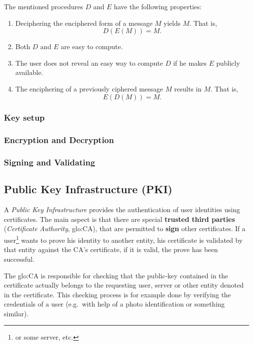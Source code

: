 The mentioned procedures $D$ and $E$ have the following properties:
\begin{enumerate}
\item Deciphering  the enciphered form of  a message $M$  yields $M$. That
  is,
  \begin{equation}
    \label{eq:1}
    D(E(M)) = M.
  \end{equation}
\item Both $D$ and $E$ are easy to compute.
\item The user does not reveal an  easy way to compute $D$ if he makes $E$
  publicly available.
\item The enciphering of a previously ciphered message $M$ results in
  $M$. That is,
  \begin{equation}
    \label{eq:1}
    E(D(M)) = M.
  \end{equation}
\end{enumerate}

\subsubsection{Key setup}

\subsubsection{Encryption and Decryption}

\subsubsection{Signing and Validating}


\subsection[Public Key Infrastructure]{Public Key Infrastructure (PKI)}

A  \emph{Public Key  Infrastructure} provides  the authentication  of user
identities using certificates.  The main  aspect is that there are special
\textbf{trusted    third     parties}    (\emph{Certificate    Authority},
\gls{glo:CA}), that are permitted  to \textbf{sign} other certificates. If
a  user\footnote{or some  server, etc.}   wants to  prove his  identity to
another entity,  his certificate is  validated by that entity  against the
CA's certificate, if it is valid, the prove has been successful.

The \gls{glo:CA} is responsible for checking that the public-key contained
in  the certificate  actually belongs  to the  requesting user,  server or
other  entity denoted  in the  certificate. This  checking process  is for
example done by  verifying the credentials of a user  (e.g.~with help of a
photo identification or something similar).

